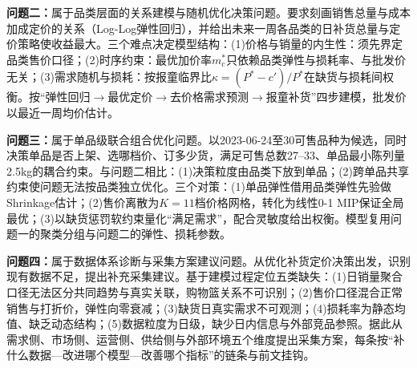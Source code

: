 \textbf{问题二：}属于品类层面的关系建模与随机优化决策问题。要求刻画销售总量与成本加成定价的关系（Log-Log弹性回归），并给出未来一周各品类的日补货总量与定价策略使收益最大。三个难点决定模型结构：(1)价格与销量的内生性：须先界定品类售价口径；(2)时序约束：最优加价率$m_c^*$只依赖品类弹性与损耗率、与批发价无关；(3)需求随机与损耗：按报童临界比$\kappa=(P^*-c')/P^*$在缺货与损耗间权衡。按“弹性回归$\to$最优定价$\to$去价格需求预测$\to$报童补货”四步建模，批发价以最近一周均价估计。

\textbf{问题三：}属于单品级联合组合优化问题。以2023-06-24至30可售品种为候选，同时决策单品是否上架、选哪档价、订多少货，满足可售总数27--33、单品最小陈列量2.5kg的耦合约束。与问题二相比：(1)决策粒度由品类下放到单品；(2)跨单品共享约束使问题无法按品类独立优化\cite{kok2009,vanryzin1999}。三个对策：(1)单品弹性借用品类弹性先验做Shrinkage估计\cite{james1961}；(2)售价离散为$K=11$档价格网格，转化为线性0-1 MIP保证全局最优\cite{wolsey1998}；(3)以缺货惩罚软约束量化“满足需求”，配合灵敏度给出权衡\cite{khouja1999}。模型复用问题一的聚类分组与问题二的弹性、损耗参数。

\textbf{问题四：}属于数据体系诊断与采集方案建议问题。从优化补货定价决策出发，识别现有数据不足，提出补充采集建议。基于建模过程定位五类缺失：(1)日销量聚合口径无法区分共同趋势与真实关联，购物篮关系不可识别；(2)售价口径混合正常销售与打折价，弹性向零衰减；(3)缺货日真实需求不可观测；(4)损耗率为静态均值、缺乏动态结构；(5)数据粒度为日级，缺少日内信息与外部竞品参照。据此从需求侧、市场侧、运营侧、供给侧与外部环境五个维度提出采集方案，每条按“补什么数据—改进哪个模型—改善哪个指标”的链条与前文挂钩。